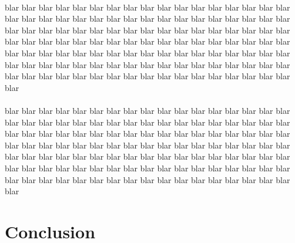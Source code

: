 \documentclass{acmsiggraph}
\begin{document}
\paragraph*{}
blar blar blar blar blar blar blar blar blar blar blar blar blar blar blar
blar blar blar blar blar blar blar blar blar blar blar blar blar blar blar
blar blar blar blar blar blar blar blar blar blar blar blar blar blar blar
blar blar blar blar blar blar blar blar blar blar blar blar blar blar blar
blar blar blar blar blar blar blar blar blar blar blar blar blar blar blar
blar blar blar blar blar blar blar blar blar blar blar blar blar blar blar
blar blar blar blar blar blar blar blar blar blar blar blar blar blar blar
blar blar blar blar blar blar blar blar blar blar blar blar blar blar blar


\paragraph*{}
blar blar blar blar blar blar blar blar blar blar blar blar blar blar blar
blar blar blar blar blar blar blar blar blar blar blar blar blar blar blar
blar blar blar blar blar blar blar blar blar blar blar blar blar blar blar
blar blar blar blar blar blar blar blar blar blar blar blar blar blar blar
blar blar blar blar blar blar blar blar blar blar blar blar blar blar blar
blar blar blar blar blar blar blar blar blar blar blar blar blar blar blar
blar blar blar blar blar blar blar blar blar blar blar blar blar blar blar
blar blar blar blar blar blar blar blar blar blar blar blar blar blar blar

\section{Conclusion}
\end{document}
